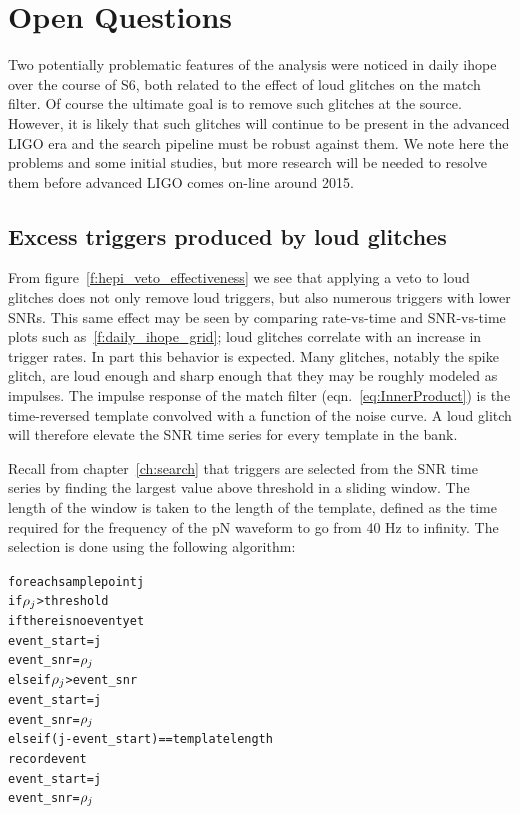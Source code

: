 \section{Open Questions}
\label{sec:daily_ihope_open_questions}

Two potentially problematic features of the analysis were noticed in
daily ihope over the course of S6, both related to the effect of loud
glitches on the match filter.  Of course the ultimate goal is to
remove such glitches at the source.  However, it is likely that such
glitches will continue to be present in the advanced LIGO era and the
search pipeline must be robust against them.  We note here the
problems and some initial studies, but more research will be needed to
resolve them before advanced LIGO comes on-line around 2015.


\subsection{Excess triggers produced by loud glitches}
\label{ssec:penguins}

From figure~\ref{f:hepi_veto_effectiveness} we see that applying a
veto to loud glitches does not only remove loud triggers, but also
numerous triggers with lower SNRs.  This same effect may be seen by
comparing rate-vs-time and SNR-vs-time plots such
as~\ref{f:daily_ihope_grid}; loud glitches correlate with an increase
in trigger rates.  In part this behavior is expected.  Many glitches,
notably the spike glitch, are loud enough and sharp enough that they
may be roughly modeled as impulses.  The impulse response of the match
filter (eqn.~\ref{eq:InnerProduct}) is the time-reversed template
convolved with a function of the noise curve.  A loud glitch will
therefore elevate the SNR time series for every template in the bank.

Recall from chapter~\ref{ch:search} that triggers are selected from
the SNR time series by finding the largest value above threshold in a
sliding window.  The length of the window is taken to the length of
the template, defined as the time required for the frequency of the pN
waveform to go from 40 Hz to infinity.  The selection is done using
the following algorithm: 

\begin{alltt}
for each sample point j
  if \(\rho\sb{j}\) > threshold
    if there is no event yet
      event\_start = j
      event\_snr   = \(\rho\sb{j}\)
    else if \(\rho\sb{j}\) > event\_snr
      event\_start = j
      event\_snr = \(\rho\sb{j}\)
    else if (j - event\_start) == template length
      record event
      event\_start = j
      event\_snr   = \(\rho\sb{j}\)
\end{alltt}

